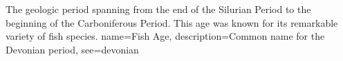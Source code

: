 %
{%
  The geologic period spanning from the end of the
  Silurian Period to the beginning of the Carboniferous Period.
  This age was known for its remarkable variety of
  fish species.
}
{
  name={Fish Age},
  description={Common name for the Devonian period},
  see={devonian}
}
